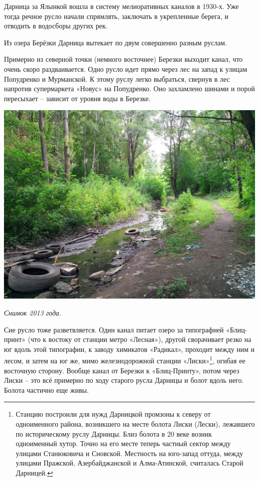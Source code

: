 Дарница за Ялынкой вошла в систему мелиоративных каналов в 1930-х. Уже тогда речное русло начали спрямлять, заключать в укрепленные берега, и отводить в водосборы других рек.

\newpage

Из озера Берёзки Дарница вытекает по двум совершенно разным руслам.

Примерно из северной точки (немного восточнее) Березки выходит канал, что очень скоро раздваивается. Одно русло идет прямо через лес на запад к улицам Попудренко и Мурманской. К этому руслу легко выбраться, свернув в лес напротив супермаркета «Новус» на Попудренко. Оно захламлено шинами и порой пересыхает – зависит от уровня воды в Березке.

\begin{center}
\includegraphics[width=\linewidth]{chast-gorodki/darn/s_darn-IMG_20130720_141133.jpg}

\textit{Снимок 2013 года.}
\end{center}

Сие русло тоже разветвляется. Один канал питает озеро за типографией «Блиц-принт» (что к востоку от станции метро «Лесная»), другой сворачивает резко на юг вдоль этой типографии, к заводу химикатов «Радикал», проходит между ним и лесом, и затем на юг же, мимо железнодорожной станции «Лиски»\footnote{Станцию построили для нужд Дарницкой промзоны к северу от одноименного района, возникшего на месте болота Лиски (Лески), лежавшего по историческому руслу Дарницы. Близ болота в 20 веке возник одноименный хутор. Точно на его месте теперь частный сектор между улицами Станюковича и Сновской. Местность на юго-запад оттуда, между улицами Пражской, Азербайджанской и Алма-Атинской, считалась Старой Дарницей.}, огибая ее восточную сторону. Вообще канал от Березки к «Блиц-Принту», потом через Лиски – это всё примерно по ходу старого русла Дарницы и болот вдоль него. Болота частично еще живы.


